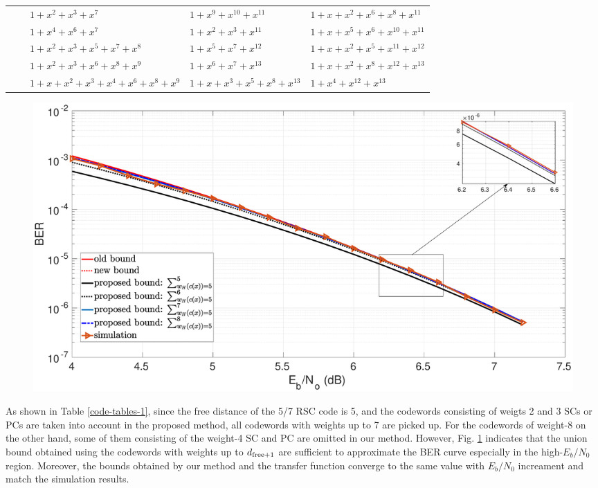 \begin{table}[htbp]
\begin{tabularx}{0.85\textwidth}{|c|c|XXX}
			&&$1+x^2+x^3+x^7$ 						& $1+x^9+x^{10}+x^{11}$ 			& $1+x+x^{2}+x^{6}+x^8+x^{11}$\\
			&&$1+x^4+x^6+x^7$ 						& $1+x^2+x^3+x^{11}$ 				& $1+x+x^{5}+x^6+x^{10}+x^{11}$\\
			&&$1+x^2+x^3+x^5+x^7+x^8$ 			& $1+x^5+x^7+x^{12}$ 				& $1+x+x^{2}+x^5+x^{11}+x^{12}$\\
			&&$1+x^2+x^3+x^6+x^8+x^9$ 			& $1+x^6+x^7+x^{13}$ 				& $1+x+x^2+x^8+x^{12}+x^{13}$\\
			&&$1+x+x^2+x^3+x^4+x^6+x^8+x^9$ 	& $1+x+x^3+x^5+x^8+x^{13}$ 		& $1+x^{4}+x^{12}+x^{13}$\\
			\bottomrule
		\end{tabularx}		
		\label{code-tables-3}
	\end{table}



\begin{figure}[htbp]
	\centering
	\includegraphics[width=1\textwidth]{./Images/RSC_5_7_lower_weights3.eps}
	\label{simFig1}
\end{figure}

As shown in Table \ref{code-tables-1}, since the free distance of the 5/7 RSC code is 5, and the codewords consisting of weigts 2 and 3 SCs or PCs are taken into account in the proposed method, all codewords with weights up to 7 are picked up. For the codewords of weight-8 on the other hand, some of them consisting of the weight-4 SC and PC are omitted in our method. However, Fig. \ref{simFig1} indicates that the union bound obtained using the codewords with weights up to $d_{\rm free+1}$ are sufficient to approximate the BER curve especially in the high-$E_b/N_0$ region. Moreover, the bounds obtained by our method and the transfer function converge to the same value with $E_b/N_0$ increament and match the simulation results. 


